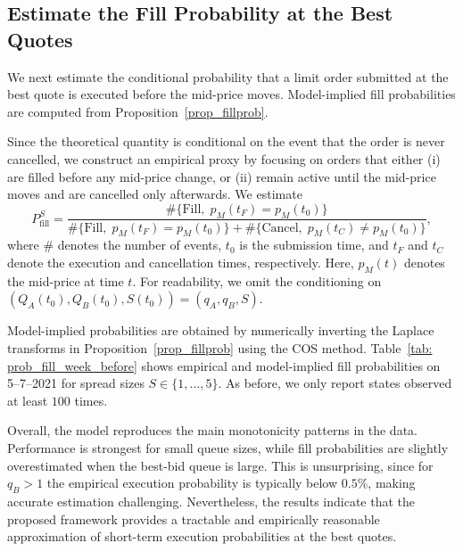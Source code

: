 \documentclass[11pt]{article}
\begin{document}
\subsection{Estimate the Fill Probability at the Best Quotes}\label{sec: fill_pro_result}

We next estimate the conditional probability that a limit order submitted at the best quote is executed before the mid-price moves. 
Model-implied fill probabilities are computed from Proposition~\ref{prop_fillprob}. 

Since the theoretical quantity is conditional on the event that the order is never cancelled, we construct an empirical proxy by focusing on orders that either (i) are filled before any mid-price change, or (ii) remain active until the mid-price moves and are cancelled only afterwards. 
We estimate
\begin{equation}\label{emp_fillprob}
    P_{\text{fill}}^S
    =
    \frac{
    \#\{\text{Fill},\; p_M(t_F)=p_M(t_0)\}
    }{
    \#\{\text{Fill},\; p_M(t_F)=p_M(t_0)\}
    +
    \#\{\text{Cancel},\; p_M(t_C)\neq p_M(t_0)\}
    },
\end{equation}
where $\#$ denotes the number of events, $t_0$ is the submission time, and $t_F$ and $t_C$ denote the execution and cancellation times, respectively. 
Here, $p_M(t)$ denotes the mid-price at time $t$. 
For readability, we omit the conditioning on $(Q_A(t_0),Q_B(t_0),S(t_0))=(q_A,q_B,S)$.

Model-implied probabilities are obtained by numerically inverting the Laplace transforms in Proposition~\ref{prop_fillprob} using the COS method. 
Table~\ref{tab: prob_fill_week_before} shows empirical and model-implied fill probabilities on 5--7--2021 for spread sizes $S\in\{1,\dots,5\}$. 
As before, we only report states observed at least $100$ times.

Overall, the model reproduces the main monotonicity patterns in the data. 
Performance is strongest for small queue sizes, while fill probabilities are slightly overestimated when the best-bid queue is large. 
This is unsurprising, since for $q_B>1$ the empirical execution probability is typically below $0.5\%$, making accurate estimation challenging. 
Nevertheless, the results indicate that the proposed framework provides a tractable and empirically reasonable approximation of short-term execution probabilities at the best quotes.
\end{document}
